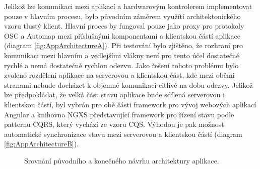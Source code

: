\documentclass[thesis=M,czech]{FITthesis}[2019/03/06]
\begin{document}
		Jelikož lze komunikaci mezi aplikací a hardwarovým kontrolerem implementovat pouze v hlavním procesu, bylo původním záměrem využítí architektonického vzoru tlustý klient. 
		Hlavní proces by fungoval pouze jako proxy pro protokoly OSC a Automap mezi příslušnými komponentami a klientskou částí aplikace (diagram \ref{fig:AppArchitectureA}).
		Při testování bylo zjištěno, že rozhraní pro komunikaci mezi hlavním a vedlejšími vlákny není pro tento účel dostatečně rychlé a nemá dostatečně rychlou odezvu.
		Jako řešení tohoto problému bylo zvoleno rozdělení aplikace na serverovou a klientskou část, kde mezi oběmi stranami nebude docházet k objemné komunikaci citlivé na dobu odezvy.
		Jelikož lze předpokládat, že velká část stavu aplikace bude sdílená serverovou i klientskou částí, byl vybrán pro obě části framework pro vývoj webových aplikací Angular a knihovna NGXS představující framework pro řízení stavu podle patternu CQRS\cite{cqrs}, který vychází ze vzoru CQS\cite{cqs}. Výhodou je pak možnost automatické synchronizace stavu mezi serverovou a klientskou částí (diagram \ref{fig:AppArchitectureB}).
		



		\begin{figure}
			\centering		
			\qquad
			\caption{Srovnání původního a konečného návrhu architektury aplikace.}
			\label{fig:AppArchitecture}
		\end{figure}
		
\end{document}
